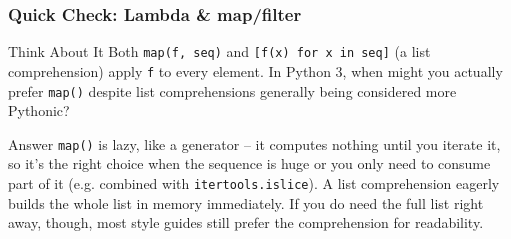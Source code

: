 \begin{frame}[fragile]\frametitle{Quick Check: Lambda \& map/filter}
\begin{block}{Think About It}
Both \lstinline|map(f, seq)| and \lstinline|[f(x) for x in seq]| (a list comprehension) apply
\texttt{f} to every element. In Python 3, when might you actually prefer \lstinline|map()|
despite list comprehensions generally being considered more Pythonic?
\end{block}
\pause
\begin{block}{Answer}
\lstinline|map()| is lazy, like a generator -- it computes nothing until you iterate it, so
it's the right choice when the sequence is huge or you only need to consume part of it (e.g.
combined with \lstinline|itertools.islice|). A list comprehension eagerly builds the whole list
in memory immediately. If you do need the full list right away, though, most style guides still
prefer the comprehension for readability.
\end{block}
\end{frame}

